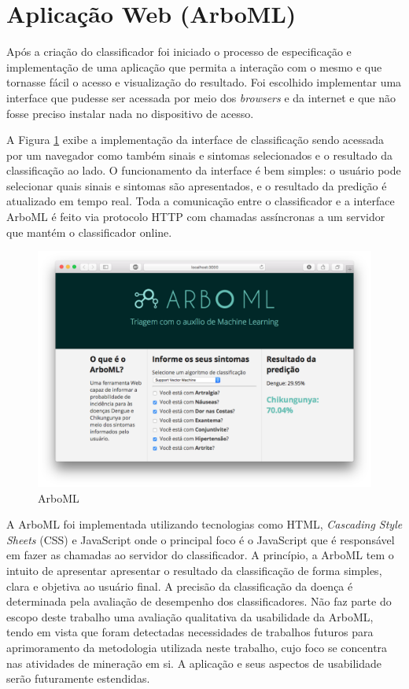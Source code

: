 \section{Aplicação Web (ArboML)}

Após a criação do classificador foi iniciado o processo de especificação e implementação de uma aplicação que permita a interação com o mesmo e que tornasse fácil o acesso e visualização do resultado. Foi escolhido implementar uma interface que pudesse ser acessada por meio dos \textit{browsers} e da internet e que não fosse preciso instalar nada no dispositivo de acesso.

A Figura \ref{fig:arboml} exibe a implementação da interface de classificação sendo acessada por um navegador como também sinais e sintomas selecionados e o resultado da classificação ao lado. O funcionamento da interface é bem simples: o usuário pode selecionar quais sinais e sintomas são apresentados, e o resultado da predição é atualizado em tempo real. Toda a comunicação entre o classificador e a interface ArboML é feito via protocolo HTTP com chamadas assíncronas a um servidor que mantém o classificador online.

\begin{figure}[htb]
  \caption{\label{fig:arboml}ArboML}
  \begin{center}
    \includegraphics[width=\textwidth]{imagens/arboML.png}
  \end{center}
\end{figure}
\newpage

A ArboML foi implementada utilizando tecnologias como HTML, \textit{Cascading Style Sheets} (CSS) e JavaScript onde o principal foco é o JavaScript que é responsável em fazer as chamadas ao servidor do classificador. A princípio, a ArboML tem o intuito de apresentar  apresentar o resultado da classificação de forma simples, clara e objetiva ao usuário final. A precisão da classificação da doença é determinada pela avaliação de desempenho dos classificadores. Não faz parte do escopo deste trabalho uma avaliação qualitativa da usabilidade da ArboML, tendo em vista que foram detectadas necessidades de trabalhos futuros para aprimoramento da metodologia utilizada neste trabalho, cujo foco se concentra nas atividades de mineração em si. A aplicação e seus aspectos de usabilidade serão futuramente estendidas.

